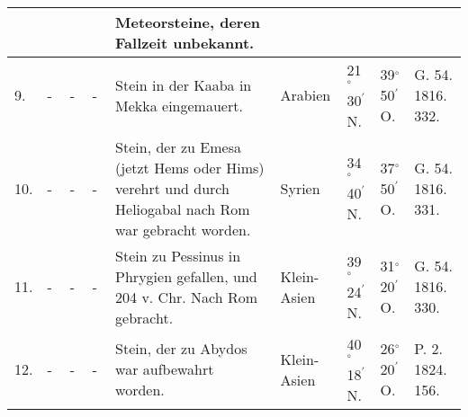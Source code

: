 \documentclass[a4paper, 11pt, oneside, polutonikogreek, german]{article}
\begin{document}
\begin{landscape}
\begin{table}[!ht]
\begin{tabular}{|l|l|l|l|l|l|l|l|l|}
          &   &   &   & Meteorsteine, deren Fallzeit unbekannt. &   &   &   &   \\ \hline
        9. & - & - & - & Stein in der Kaaba in Mekka eingemauert. & Arabien & 21$^\circ$ 30$^\prime$ N. & 39$^\circ$ 50$^\prime$ O. & G. 54. 1816. 332. \\ \hline
        10. & - & - & - & Stein, der zu Emesa (jetzt Hems oder Hims) verehrt und durch Heliogabal nach Rom war gebracht worden. & Syrien & 34$^\circ$ 40$^\prime$ N. & 37$^\circ$ 50$^\prime$ O. & G. 54. 1816. 331. \\ \hline
        11. & - & - & - & Stein zu Pessinus in Phrygien gefallen, und 204 v. Chr. Nach Rom gebracht. & Klein-Asien & 39$^\circ$ 24$^\prime$ N. & 31$^\circ$ 20$^\prime$ O. & G. 54. 1816. 330. \\ \hline
        12. & - & - & - & Stein, der zu Abydos war aufbewahrt worden. & Klein-Asien & 40$^\circ$ 18$^\prime$ N. & 26$^\circ$ 20$^\prime$ O. & P. 2. 1824. 156. \\ \hline
    \end{tabular}
\end{table}
\end{landscape}
\clearpage
\end{document}
